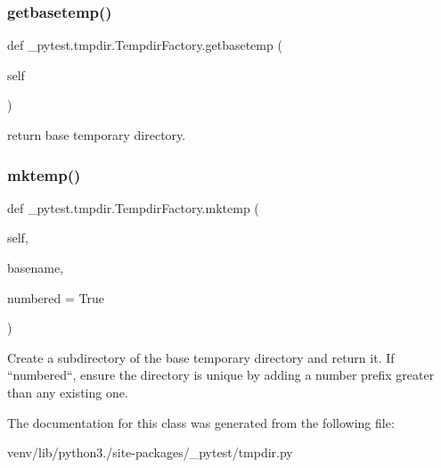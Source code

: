 \subsubsection{\texorpdfstring{getbasetemp()}{getbasetemp()}}
{\footnotesize\ttfamily def \+\_\+pytest.\+tmpdir.\+Tempdir\+Factory.\+getbasetemp (\begin{DoxyParamCaption}\item[{}]{self }\end{DoxyParamCaption})}

\begin{DoxyVerb}return base temporary directory. \end{DoxyVerb}
 \mbox{\label{class__pytest_1_1tmpdir_1_1_tempdir_factory_a3a41e666a0a7da2e5d90f110971e0090}} 
\subsubsection{\texorpdfstring{mktemp()}{mktemp()}}
{\footnotesize\ttfamily def \+\_\+pytest.\+tmpdir.\+Tempdir\+Factory.\+mktemp (\begin{DoxyParamCaption}\item[{}]{self,  }\item[{}]{basename,  }\item[{}]{numbered = {\ttfamily True} }\end{DoxyParamCaption})}

\begin{DoxyVerb}Create a subdirectory of the base temporary directory and return it.
If ``numbered``, ensure the directory is unique by adding a number
prefix greater than any existing one.
\end{DoxyVerb}
 

The documentation for this class was generated from the following file\+:\begin{DoxyCompactItemize}
\item 
venv/lib/python3./site-\/packages/\+\_\+pytest/tmpdir.\+py\end{DoxyCompactItemize}
